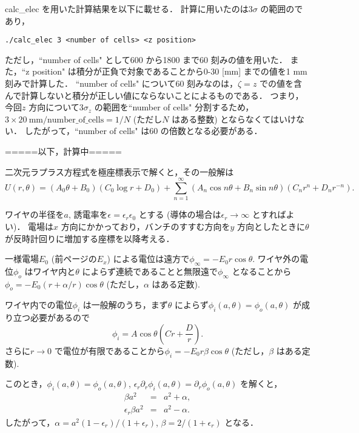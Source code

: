 \documentclass{jsarticle}
\begin{document}
\newpage

calc\_elec を用いた計算結果を以下に載せる．
計算に用いたのは$3 \sigma$ の範囲のであり，
\begin{lstlisting}
./calc_elec 3 <number of cells> <z position>
\end{lstlisting}
ただし，``number of cells" として600 から1800 まで60 刻みの値を用いた．
また，``z position" は積分が正負で対象であることから0-30 [mm] までの値を1 mm 刻みで計算した．
``number of cells" について60 刻みなのは，$\zeta = z$ での値を含んで計算しないと積分が正しい値にならないことによるものである．
つまり，今回$z$ 方向について$3\sigma_z$ の範囲を``number of cells" 分割するため，$3 \times 20~\mathrm{mm} / \mathrm{number\_of\_cells} = 1/N$ (ただし$N$ はある整数) とならなくてはいけない．
したがって，``number of cells" は60 の倍数となる必要がある．
\begin{center}
=====以下，計算中=====
\end{center}

\newpage

二次元ラプラス方程式を極座標表示で解くと，その一般解は
\begin{equation}
U(r, \theta) = (A_0\theta + B_0)(C_0\log r + D_0)  + \sum_{n = 1}^\infty (A_n\cos n\theta + B_n\sin n\theta)(C_n r^n + D_n r^{-n}).
\end{equation}

ワイヤの半径を$a$, 誘電率を$\epsilon = \epsilon_r \epsilon_0$ とする (導体の場合は$\epsilon_r\to\infty$ とすればよい)．
電場は$x$ 方向にかかっており，バンチのすすむ方向を$y$ 方向としたときに$\theta$ が反時計回りに増加する座標を以降考える．

一様電場$E_0$ (前ページの$E_x$) による電位は遠方で$\phi_\infty = -E_0r\cos\theta$.
ワイヤ外の電位$\phi_o$ はワイヤ内と$\theta$ によらず連続であることと無限遠で$\phi_\infty$ となることから$\phi_o = -E_0(r + \alpha/r)\cos\theta$ (ただし，$\alpha$ はある定数).

ワイヤ内での電位$\phi_i$ は一般解のうち，まず$\theta$ によらず$\phi_i(a,\theta) = \phi_o(a,\theta)$ が成り立つ必要があるので
\begin{equation}
\phi_i = A\cos\theta (Cr + \frac{D}{r}).
\end{equation}
さらに$r\to 0$ で電位が有限であることから$\phi_i = -E_0r\beta\cos\theta$ (ただし，$\beta$ はある定数).


このとき，$\phi_i(a,\theta) = \phi_o(a,\theta)$, $\epsilon_r\partial_r\phi_i(a, \theta) = \partial_r\phi_o(a, \theta)$ を解くと，
\begin{eqnarray}
\beta a^2 &=& a^2 + \alpha, \\
\epsilon_r \beta a^2 &=& a^2 - \alpha.
\end{eqnarray}
したがって，$\alpha = a^2(1-\epsilon_r)/(1+\epsilon_r)$, $\beta = 2/(1+\epsilon_r)$ となる．
\end{document}
